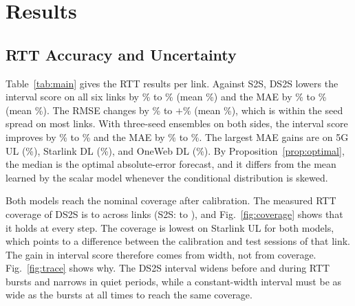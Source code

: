 \section{Results}
\label{sec:results}
\subsection{RTT Accuracy and Uncertainty}
Table~\ref{tab:main} gives the RTT results per link. Against S2S, DS2S lowers the interval score on all six links by \ChgMISWorst\% to \ChgMISBest\% (mean \ChgMISMean\%) and the MAE by \ChgMAEWorst\% to \ChgMAEBest\% (mean \ChgMAEMean\%). The RMSE changes by \ChgRMSEBest\% to $+$\ChgRMSEWorst\% (mean \ChgRMSEMean\%), which is within the seed spread on most links. With three-seed ensembles on both sides, the interval score improves by \ChgEnsMISWorst\% to \ChgEnsMISBest\% and the MAE by \ChgEnsMAEWorst\% to \ChgEnsMAEBest\%. The largest MAE gains are on 5G UL (\ChgMAEQUL\%), Starlink DL (\ChgMAESLDL\%), and OneWeb DL (\ChgMAEOWDL\%). By Proposition~\ref{prop:optimal}, the median is the optimal absolute-error forecast, and it differs from the mean learned by the scalar model whenever the conditional distribution is skewed.

\begin{table}[t]
\centering
\caption{RTT on the test sessions, averaged over 0.2--3\,s. Mean $\pm$ std over three seeds and three-seed ensembles (-E). MAE, RMSE, and IS in ms. IS and PICP refer to the calibrated 95\% interval.}
\label{tab:main}
\scriptsize
\setlength{\tabcolsep}{1.6pt}
\end{table}

Both models reach the nominal coverage after calibration. The measured RTT coverage of DS2S is \PICPMin{} to \PICPMax{} across links (S2S: \PICPPrevSLUL{} to \PICPPrevOWDL), and Fig.~\ref{fig:coverage} shows that it holds at every step. The coverage is lowest on Starlink UL for both models, which points to a difference between the calibration and test sessions of that link. The gain in interval score therefore comes from width, not from coverage. Fig.~\ref{fig:trace} shows why. The DS2S interval widens before and during RTT bursts and narrows in quiet periods, while a constant-width interval must be as wide as the bursts at all times to reach the same coverage.

